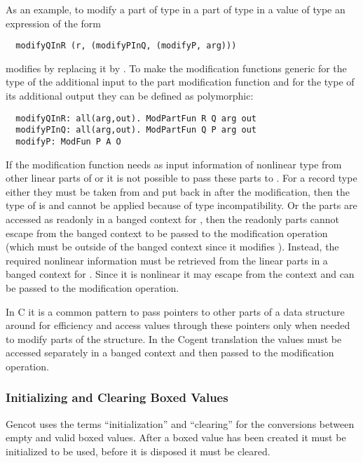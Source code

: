 As an example, to modify a part  of type  in a part  of type  in a value  of type 
an expression of the form
\begin{verbatim}
  modifyQInR (r, (modifyPInQ, (modifyP, arg)))
\end{verbatim}
modifies  by replacing it by . To make the modification functions generic for the type of the additional input
to the part modification function and for the type of its additional output they can be defined as polymorphic:
\begin{verbatim}
  modifyQInR: all(arg,out). ModPartFun R Q arg out
  modifyPInQ: all(arg,out). ModPartFun Q P arg out
  modifyP: ModFun P A O
\end{verbatim}

If the modification function  needs as input information of nonlinear type from other linear parts of  or  it is not
possible to pass these parts to . For a record type  either they must be taken from  and put back in after the modification, then
the type of  is  and  cannot be applied because of type incompatibility. Or the parts are
accessed as readonly in a banged context for , then the readonly parts cannot escape from the banged context to be passed to the
modification operation (which must be outside of the banged context since it modifies ). Instead, the required nonlinear information must 
be retrieved from the linear parts in a banged context for . Since it is nonlinear it may escape from the context and can be passed 
to the modification operation.

In C it is a common pattern to pass pointers to other parts of a data structure around for efficiency and access values through these pointers 
only when needed to modify parts of the structure. In the Cogent translation the values must be accessed separately in a banged context and then
passed to the modification operation.

\subsubsection{Initializing and Clearing Boxed Values}

Gencot uses the terms ``initialization'' and ``clearing'' for the conversions between empty and valid boxed values.
After a boxed value has been created it must be initialized to be used, before it is disposed it must be cleared.

